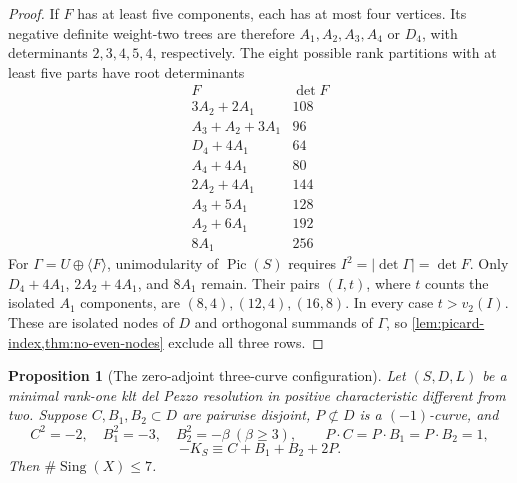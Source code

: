 \documentclass[11pt,reqno]{amsart}
\newtheorem{proposition}[proposition]{Proposition}
\theoremstyle{definition}
\theoremstyle{remark}
\DeclareMathOperator{\Sing}{Sing}
\DeclareMathOperator{\Pic}{Pic}
\numberwithin{equation}{section}
\begin{document}
\begin{proof}
If $F$ has at least five components, each has at most four vertices.
Its negative definite weight-two trees are therefore $A_1,A_2,A_3,A_4$
or $D_4$, with determinants $2,3,4,5,4$, respectively.
The eight possible rank partitions with at least five parts have
root determinants
\[
\begin{array}{c|r}
F&\det F\\\hline
3A_2+2A_1&108\\
A_3+A_2+3A_1&96\\
D_4+4A_1&64\\
A_4+4A_1&80\\
2A_2+4A_1&144\\
A_3+5A_1&128\\
A_2+6A_1&192\\
8A_1&256
\end{array}
\]
For $\Gamma=U\oplus\langle F\rangle$, unimodularity of $\Pic(S)$
requires $I^2=|\det\Gamma|=\det F$.
Only $D_4+4A_1$, $2A_2+4A_1$, and $8A_1$ remain.
Their pairs $(I,t)$, where $t$ counts the isolated $A_1$ components,
are $(8,4),(12,4),(16,8)$.
In every case $t>v_2(I)$.
These are isolated nodes of $D$ and orthogonal summands of
$\Gamma$, so \cref{lem:picard-index,thm:no-even-nodes}
exclude all three rows.
\end{proof}

\begin{proposition}[The zero-adjoint three-curve configuration]
\label{prop:zero-adjoint}
Let $(S,D,L)$ be a minimal rank-one klt del Pezzo resolution in
positive characteristic different from two. Suppose $C,B_1,B_2\subset D$
are pairwise disjoint, $P\not\subset D$ is a $(-1)$-curve, and
\[
 C^2=-2,\quad B_1^2=-3,\quad B_2^2=-\beta\ (\beta\ge3),\qquad
 P\cdot C=P\cdot B_1=P\cdot B_2=1,
\]
\[
 -K_S\equiv C+B_1+B_2+2P.
\]
Then $\#\Sing(X)\le7$. 
\end{proposition}
\end{document}
